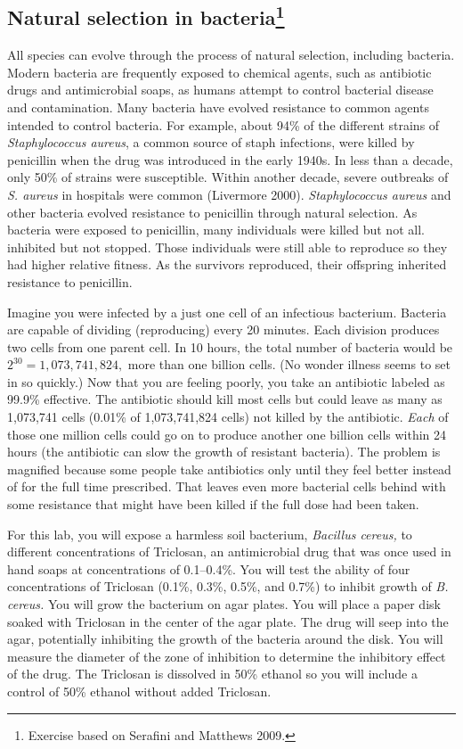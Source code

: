 \documentclass[12pt]{exam}
\begin{document}
\subsection*{Natural selection in bacteria\footnote{Exercise based on Serafini and Matthews 2009.}}

All species can evolve through the process of natural selection, including bacteria. Modern bacteria are frequently exposed to chemical agents, such as antibiotic drugs and antimicrobial soaps, as humans attempt to control bacterial disease and contamination. Many bacteria have evolved resistance to common agents intended to control bacteria. For example, about 94\% of the different strains of \textit{Staphylococcus aureus}, a common source of staph infections, were killed by penicillin when the drug was introduced in the early 1940s. In less than a decade, only 50\% of strains were susceptible. Within another decade, severe outbreaks of \textit{S. aureus} in hospitals were common (Livermore 2000). \textit{Staphylococcus aureus} and other bacteria evolved resistance to penicillin through natural selection. As bacteria were exposed to penicillin, many individuals were killed but not all.  inhibited but not stopped. Those individuals were still able to reproduce so they had higher relative fitness. As the survivors reproduced, their offspring inherited resistance to penicillin. 

Imagine you were infected by a just one cell of an infectious bacterium. Bacteria are capable of dividing (reproducing) every 20 minutes. Each division produces two cells from one parent cell. In 10 hours, the total number of bacteria would be $2^{30} = 1,073,741,824,$ more than one billion cells. (No wonder illness seems to set in so quickly.) Now that you are feeling poorly, you take an antibiotic labeled as 99.9\% effective. The antibiotic should kill most cells but could leave as many as 1,073,741 cells (0.01\% of 1,073,741,824 cells) not killed by the antibiotic. \emph{Each} of those one million cells could go on to produce another one billion cells within 24 hours (the antibiotic can slow the growth of resistant bacteria). The problem is magnified because some people take antibiotics only until they feel better instead of for the full time prescribed. That leaves even more bacterial cells behind with some resistance that might have been killed if the full dose had been taken. 

For this lab, you will expose a harmless soil bacterium, \textit{Bacillus cereus,} to different concentrations of Triclosan, an antimicrobial drug that was once used in hand soaps at concentrations of 0.1–0.4\%. You will test the ability of four concentrations of Triclosan (0.1\%, 0.3\%, 0.5\%, and 0.7\%) to inhibit growth of \textit{B. cereus.} You will grow the bacterium on agar plates. You will place a paper disk soaked with Triclosan in the center of the agar plate. The drug will seep into the agar, potentially inhibiting the growth of the bacteria around the disk. You will measure the diameter of the zone of inhibition to determine the inhibitory effect of the drug. The Triclosan is dissolved in 50\% ethanol so you will include a control of 50\% ethanol without added Triclosan.
\end{document}
